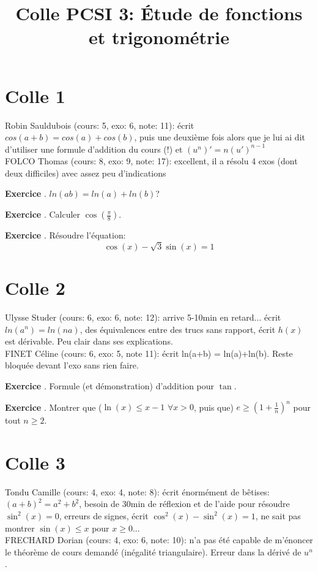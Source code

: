 \documentclass[10pt,a4paper]{article}
\title{Colle PCSI 3: Étude de fonctions et trigonométrie}
\newcounter{question}
\newcounter{exo}
\newenvironment{exo}{\vspace{0.5cm}\setcounter{question}{0}\addtocounter{exo}{1} \noindent \textbf{Exercice \theexo}. \normalsize }{\par}
\begin{document}
	\maketitle

	\section*{Colle 1}
	Robin Sauldubois (cours: 5, exo: 6, note: 11): écrit $cos(a + b) = cos(a) + cos(b)$, puis une deuxième fois alors que je lui ai dit d'utiliser une formule d'addition du cours (!) et $(u^n)' = n (u')^{n-1}$\\
	FOLCO Thomas (cours: 8, exo: 9, note: 17): excellent, il a résolu 4 exos (dont deux difficiles) avec assez peu d'indications 
	
	\begin{exo}
		$ln(ab) = ln(a)+ln(b)$?
	\end{exo}
	
	\begin{exo}
		Calculer $\cos(\frac{\pi}{8})$.
	\end{exo}
	
	\begin{exo}
		Résoudre l'équation:
		$$\cos(x) - \sqrt{3} \sin(x) = 1$$
	\end{exo}

	\section*{Colle 2}
	\setcounter{exo}{0}
	Ulysse Studer (cours: 6, exo: 6, note: 12):  arrive 5-10min en retard... écrit $ln(a^n) = ln(n a)$, des équivalences entre des trucs sans rapport, écrit $h(x)$ est dérivable. Peu clair dans ses explications. \\
	FINET Céline (cours: 6, exo: 5, note 11): écrit ln(a+b) = ln(a)+ln(b). Reste bloquée devant l'exo sans rien faire. 
	\begin{exo}
		Formule (et démonstration) d'addition pour $\tan$.
	\end{exo}

	\begin{exo}
		Montrer que ($\ln(x) \leq x - 1$ $\forall x > 0$, puis que) $e \geq (1 + \frac{1}{n})^n$ pour tout $n \geq 2$.
	\end{exo}

	\section*{Colle 3}
	\setcounter{exo}{0}
	Tondu Camille (cours: 4, exo: 4, note: 8): écrit énormément de bêtises: $(a+b)^2 = a^2 + b^2$, besoin de 30min de réflexion et de l'aide pour résoudre $\sin^2(x) = 0$, erreurs de signes, écrit $\cos^2(x) - \sin^2(x) = 1$, ne sait pas montrer $\sin(x) \leq x$ pour $x \geq 0$... \\
	FRECHARD Dorian (cours: 4, exo: 6, note: 10): n'a pas été capable de m'énoncer le théorème de cours demandé (inégalité triangulaire). Erreur dans la dérivé de $u^n$. 
	
\end{document}
